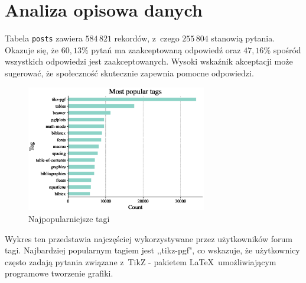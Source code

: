 \documentclass[12pt]{article}
\begin{document}
    \section{Analiza opisowa danych}\label{sec:analiza-opisowa-danych}
	Tabela \verb|posts| zawiera $584\,821$ rekordów, z~czego $255\,804$ stanowią pytania. Okazuje się, że $60,13\%$ pytań ma zaakceptowaną odpowiedź oraz $47,16\%$ spośród wszystkich odpowiedzi jest zaakceptowanych. Wysoki wskaźnik akceptacji może sugerować, że społeczność skutecznie zapewnia pomocne odpowiedzi.
	
	\begin{figure}[H]
		\centering
		\includegraphics[width=0.7\textwidth]{tags_popularity}
		\caption{Najpopularniejsze tagi}
		\label{fig:most-popular-tags}
	\end{figure}
	Wykres ten przedstawia najczęściej wykorzystywane przez użytkowników forum tagi. Najbardziej popularnym tagiem jest ,,tikz-pgf", co wskazuje, że użytkownicy często zadają pytania związane z~TikZ - pakietem \LaTeX~umożliwiającym programowe tworzenie grafiki. 
	
\end{document}
